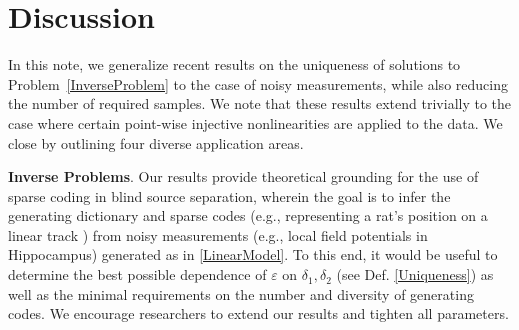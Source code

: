 \documentclass[journal, twocolumn]{IEEEtran}
\begin{document}
\section{Discussion}\label{Discussion}

In this note, we generalize recent results \cite{Hillar15} on the uniqueness of solutions to Problem~\ref{InverseProblem} to the case of noisy measurements, while also reducing the number of required samples.
We note that these results extend trivially to the case where certain point-wise injective nonlinearities are applied to the data. We close by outlining  four diverse application areas.


\textbf{Inverse Problems}.  
Our results provide theoretical grounding for the use of sparse coding in blind source separation, wherein the goal is to infer the generating dictionary and sparse codes (e.g., representing a rat's position on a linear track \cite{Agarwal14}) from noisy measurements (e.g., local field potentials in Hippocampus) generated as in \eqref{LinearModel}. To this end, it would be useful to determine the best possible dependence of $\varepsilon$ on $\delta_1, \delta_2$ (see Def. \ref{Uniqueness}) as well as the minimal requirements on the number and diversity of generating codes. We encourage researchers to extend our results and tighten all parameters.
\end{document}
